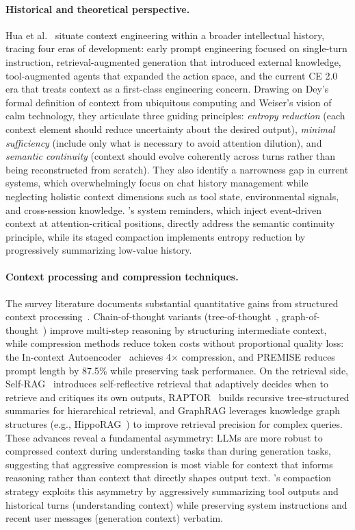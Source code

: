 \paragraph{Historical and theoretical perspective.} Hua et al.~\cite{hua2025context} situate context engineering within a broader intellectual history, tracing four eras of development: early prompt engineering focused on single-turn instruction, retrieval-augmented generation that introduced external knowledge, tool-augmented agents that expanded the action space, and the current CE 2.0 era that treats context as a first-class engineering concern. Drawing on Dey's formal definition of context from ubiquitous computing and Weiser's vision of calm technology, they articulate three guiding principles: \emph{entropy reduction} (each context element should reduce uncertainty about the desired output), \emph{minimal sufficiency} (include only what is necessary to avoid attention dilution), and \emph{semantic continuity} (context should evolve coherently across turns rather than being reconstructed from scratch). They also identify a narrowness gap in current systems, which overwhelmingly focus on chat history management while neglecting holistic context dimensions such as tool state, environmental signals, and cross-session knowledge. \name's system reminders, which inject event-driven context at attention-critical positions, directly address the semantic continuity principle, while its staged compaction implements entropy reduction by progressively summarizing low-value history.

\paragraph{Context processing and compression techniques.} The survey literature documents substantial quantitative gains from structured context processing~\cite{mei2025survey}. Chain-of-thought variants (tree-of-thought~\cite{yao2023tree}, graph-of-thought~\cite{besta2023graph}) improve multi-step reasoning by structuring intermediate context, while compression methods reduce token costs without proportional quality loss: the In-context Autoencoder~\cite{ge2023context} achieves 4$\times$ compression, and PREMISE reduces prompt length by 87.5\% while preserving task performance. On the retrieval side, Self-RAG~\cite{asai2023self} introduces self-reflective retrieval that adaptively decides when to retrieve and critiques its own outputs, RAPTOR~\cite{sarthi2024raptor} builds recursive tree-structured summaries for hierarchical retrieval, and GraphRAG leverages knowledge graph structures (e.g., HippoRAG~\cite{gutierrez2024hipporag}) to improve retrieval precision for complex queries. These advances reveal a fundamental asymmetry: LLMs are more robust to compressed context during understanding tasks than during generation tasks, suggesting that aggressive compression is most viable for context that informs reasoning rather than context that directly shapes output text. \name's compaction strategy exploits this asymmetry by aggressively summarizing tool outputs and historical turns (understanding context) while preserving system instructions and recent user messages (generation context) verbatim.

